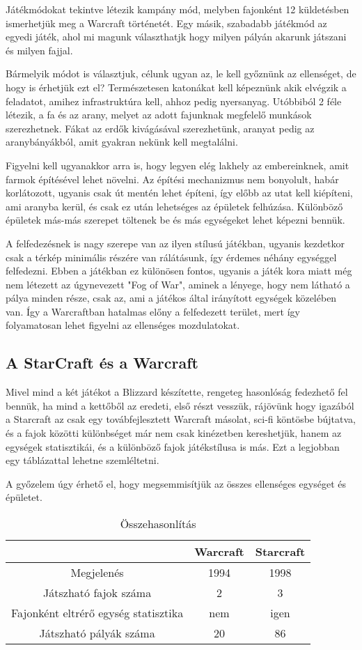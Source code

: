 Játékmódokat tekintve létezik kampány mód, melyben fajonként 12 küldetésben ismerhetjük meg a Warcraft történetét.
Egy másik, szabadabb játékmód az egyedi játék, ahol mi magunk választhatjk hogy milyen pályán akarunk játszani és milyen fajjal. 

Bármelyik módot is választjuk, célunk ugyan az, le kell győznünk az ellenséget, de hogy is érhetjük ezt el? Természetesen katonákat kell képeznünk akik elvégzik a feladatot, amihez infrastruktúra kell, ahhoz pedig nyersanyag. Utóbbiból 2 féle létezik, a fa és az arany, melyet az adott fajunknak megfelelő munkások szerezhetnek. Fákat az erdők kivágásával szerezhetünk, aranyat pedig az aranybányákból, amit gyakran nekünk kell megtalálni. 

Figyelni kell ugyanakkor arra is, hogy legyen elég lakhely az embereinknek, amit farmok építésével lehet növelni. Az építési mechanizmus nem bonyolult, habár korlátozott, ugyanis csak út mentén lehet építeni, így előbb az utat kell kiépíteni, ami aranyba kerül, és csak ez után lehetséges az épületek felhúzása. Különböző épületek más-más szerepet töltenek be és más egységeket lehet képezni bennük. 

A felfedezésnek is nagy szerepe van az ilyen stílusú játékban, ugyanis kezdetkor csak a térkép minimális részére van rálátásunk, így érdemes néhány egységgel felfedezni. Ebben a játékban ez különösen fontos, ugyanis a játék kora miatt még nem létezett az úgynevezett "Fog of War", aminek a lényege, hogy nem látható a pálya minden része, csak az, ami a játékos által irányított egységek közelében van. Így a Warcraftban hatalmas előny a felfedezett terület, mert így folyamatosan lehet figyelni az ellenséges mozdulatokat.

\subsection{A StarCraft és a Warcraft}
Mivel mind a két játékot a Blizzard készítette, rengeteg hasonlóság fedezhető fel bennük, ha mind a kettőből az eredeti, első részt vesszük, rájövünk hogy igazából a Starcraft az csak egy továbfejlesztett Warcraft másolat, sci-fi köntösbe bújtatva, és a fajok közötti különbséget már nem csak kinézetben kereshetjük, hanem az egységek statisztikái, és a különböző fajok játékstílusa is más. Ezt a legjobban egy táblázattal lehetne szemléltetni.

A győzelem úgy érhető el, hogy megsemmisítjük az összes ellenséges egységet és épületet.
\begin{table}[h]
    \centering
    \caption{Összehasonlítás}
    \label{tab:osszehasonlitas}
    \begin{tabular}{|c|c|c|}
    \hline
    ~ & Warcraft & Starcraft \\
    \hline
    Megjelenés & 1994 & 1998 \\
    Játszható fajok száma & 2 & 3 \\
    Fajonként eltrérő egység statisztika & nem & igen \\
    Játszható pályák száma & 20 & 86 \\
    \hline
    \end{tabular}
\end{table}

